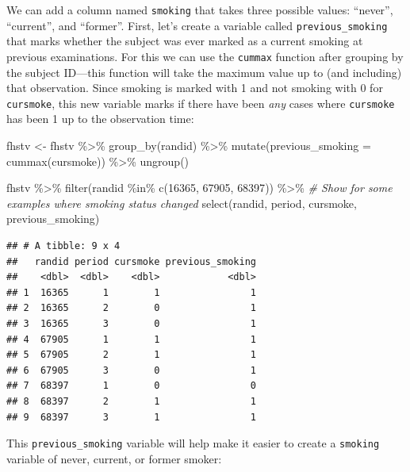 \documentclass[
]{book}
\newenvironment{Shaded}{\begin{snugshade}}{\end{snugshade}}
\newcommand{\AttributeTok}[1]{\textcolor[rgb]{0.77,0.63,0.00}{#1}}
\newcommand{\CommentTok}[1]{\textcolor[rgb]{0.56,0.35,0.01}{\textit{#1}}}
\newcommand{\DecValTok}[1]{\textcolor[rgb]{0.00,0.00,0.81}{#1}}
\newcommand{\FunctionTok}[1]{\textcolor[rgb]{0.00,0.00,0.00}{#1}}
\newcommand{\NormalTok}[1]{#1}
\newcommand{\OtherTok}[1]{\textcolor[rgb]{0.56,0.35,0.01}{#1}}
\newcommand{\SpecialCharTok}[1]{\textcolor[rgb]{0.00,0.00,0.00}{#1}}
\begin{document}
We can add a column named \texttt{smoking} that takes three possible values: ``never'', ``current'', and ``former''. First, let's create a variable called \texttt{previous\_smoking} that marks whether the subject was ever marked as a current smoking at previous examinations. For this we can use the \texttt{cummax} function after grouping by the subject ID---this function will take the maximum value up to (and including) that observation. Since smoking is marked with 1 and not smoking with 0 for \texttt{cursmoke}, this new variable marks if there have been \emph{any} cases where \texttt{cursmoke} has been 1 up to the observation time:

\begin{Shaded}
\begin{Highlighting}[]
\NormalTok{fhstv }\OtherTok{\textless{}{-}}\NormalTok{ fhstv }\SpecialCharTok{\%\textgreater{}\%} 
  \FunctionTok{group\_by}\NormalTok{(randid) }\SpecialCharTok{\%\textgreater{}\%} 
  \FunctionTok{mutate}\NormalTok{(}\AttributeTok{previous\_smoking =} \FunctionTok{cummax}\NormalTok{(cursmoke)) }\SpecialCharTok{\%\textgreater{}\%} 
  \FunctionTok{ungroup}\NormalTok{()}

\NormalTok{fhstv }\SpecialCharTok{\%\textgreater{}\%} 
  \FunctionTok{filter}\NormalTok{(randid }\SpecialCharTok{\%in\%} \FunctionTok{c}\NormalTok{(}\DecValTok{16365}\NormalTok{, }\DecValTok{67905}\NormalTok{, }\DecValTok{68397}\NormalTok{)) }\SpecialCharTok{\%\textgreater{}\%} \CommentTok{\# Show for some examples where smoking status changed}
  \FunctionTok{select}\NormalTok{(randid, period, cursmoke, previous\_smoking)}
\end{Highlighting}
\end{Shaded}

\begin{verbatim}
## # A tibble: 9 x 4
##   randid period cursmoke previous_smoking
##    <dbl>  <dbl>    <dbl>            <dbl>
## 1  16365      1        1                1
## 2  16365      2        0                1
## 3  16365      3        0                1
## 4  67905      1        1                1
## 5  67905      2        1                1
## 6  67905      3        0                1
## 7  68397      1        0                0
## 8  68397      2        1                1
## 9  68397      3        1                1
\end{verbatim}

This \texttt{previous\_smoking} variable will help make it easier to create a \texttt{smoking} variable of never, current, or former smoker:
\end{document}

